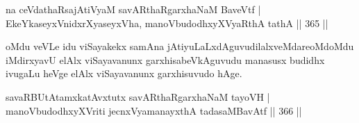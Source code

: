 \begin{shl}
na ceVdathaRsajAtiVyaM savARthaRgarxhaNaM BaveVtf |
EkeYkaseyxVnidxrXyaseyxVha, manoVbudodhxyXVyaRthA tathA \hfill || 365 ||
\end{shl}

\begin{artha}
oMdu veVLe idu viSayakekx samAna jAtiyuLaLxdAguvudilalxveMdare\break oMdoMdu iMdirxyavU elAlx viSayavanunx garxhisabeVkAguvudu manasusx budidhx ivugaLu heVge elAlx viSayavanunx garxhisuvudo hAge.
\end{artha}


\begin{shl}
savaRBUtAtamxkatAvxtutx savARthaRgarxhaNaM tayoVH |
manoVbudodhxyXVriti jecnxVyamanayxthA tadasaMBavAtf \hfill || 366 ||
\end{shl}

